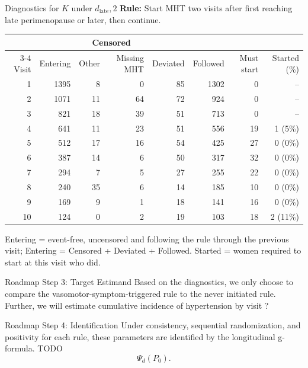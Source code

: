 \documentclass[11pt, xcolor={dvipsnames}, usepdftitle=false]{beamer}
\begin{document}
\begin{frame}{Diagnostics for $K$ under $d_\text{late}, 2$}
\centering
{\small \textbf{Rule:} Start MHT two visits after first reaching late perimenopause or later, then continue.}\par\vspace{6pt}
{\scriptsize
\begin{tabular}{r r r r r r r r}
\toprule
 & & \multicolumn{2}{c}{Censored} & & & & \\
\cmidrule(lr){3-4}
Visit & Entering & Other & Missing MHT & Deviated & Followed & Must start & Started (\%) \\
\midrule
1 & 1395 & 8 & 0 & 85 & 1302 & 0 & -- \\
2 & 1071 & 11 & 64 & 72 & 924 & 0 & -- \\
3 & 821 & 18 & 39 & 51 & 713 & 0 & -- \\
4 & 641 & 11 & 23 & 51 & 556 & 19 & 1 (5\%) \\
5 & 512 & 17 & 16 & 54 & 425 & 27 & 0 (0\%) \\
6 & 387 & 14 & 6 & 50 & 317 & 32 & 0 (0\%) \\
7 & 294 & 7 & 5 & 27 & 255 & 22 & 0 (0\%) \\
8 & 240 & 35 & 6 & 14 & 185 & 10 & 0 (0\%) \\
9 & 169 & 9 & 1 & 18 & 141 & 16 & 0 (0\%) \\
10 & 124 & 0 & 2 & 19 & 103 & 18 & 2 (11\%) \\
\bottomrule
\end{tabular}}
\par\vspace{6pt}
{\tiny Entering = event-free, uncensored and following the rule through the previous visit; Entering = Censored + Deviated + Followed. Started = women required to start at this visit who did.}
\end{frame}

\begin{frame}{Roadmap Step 3: Target Estimand}
Based on the diagnostics, we only choose to compare the vasomotor-symptom-triggered rule to the never initiated rule. Further, we will estimate cumulative incidence of hypertension by visit ?
\end{frame}

\begin{frame}{Roadmap Step 4: Identification}
Under consistency, sequential randomization, and positivity for each rule, these parameters are identified by the longitudinal g-formula. 
TODO
\[
\Psi_d(P_0).
\]
\end{frame}
\end{document}
